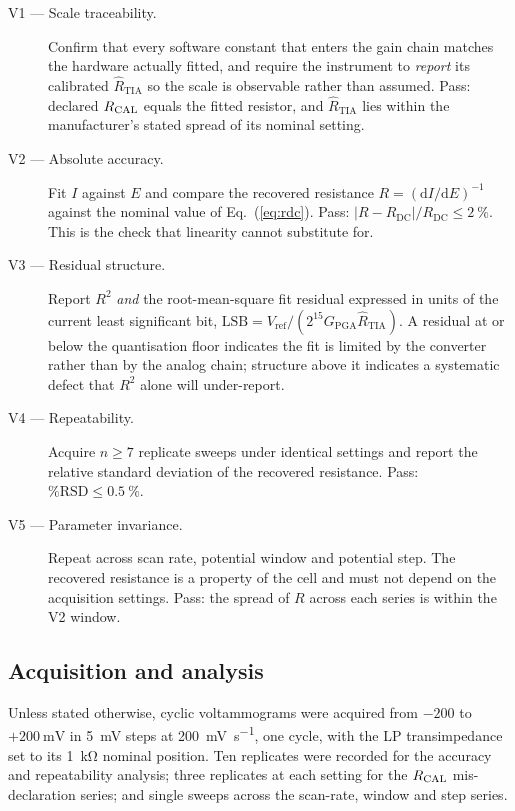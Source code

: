 \begin{description}
\item[V1 --- Scale traceability.] Confirm that every software constant that
  enters the gain chain matches the hardware actually fitted, and require the
  instrument to \emph{report} its calibrated $\hat{R}_{\mathrm{TIA}}$ so the
  scale is observable rather than assumed. Pass: declared $R_{\mathrm{CAL}}$ equals the
  fitted resistor, and $\hat{R}_{\mathrm{TIA}}$ lies within the manufacturer's
  stated spread of its nominal setting.
\item[V2 --- Absolute accuracy.] Fit $I$ against $E$ and compare the recovered
  resistance $R = (\mathrm{d}I/\mathrm{d}E)^{-1}$ against the nominal value of
  Eq.~(\ref{eq:rdc}). Pass: $|R - R_{\mathrm{DC}}|/R_{\mathrm{DC}} \le
  \SI{2}{\percent}$. This is the check that linearity cannot substitute for.
\item[V3 --- Residual structure.] Report $R^2$ \emph{and} the root-mean-square
  fit residual expressed in units of the current least significant bit,
  $\mathrm{LSB} = V_{\mathrm{ref}}/(2^{15}G_{\mathrm{PGA}}\hat{R}_{\mathrm{TIA}})$.
  A residual at or below the quantisation floor indicates the fit is limited by
  the converter rather than by the analog chain; structure above it indicates a
  systematic defect that $R^2$ alone will under-report.
\item[V4 --- Repeatability.] Acquire $n \ge 7$ replicate sweeps under identical
  settings and report the relative standard deviation of the recovered
  resistance. Pass: $\%\mathrm{RSD} \le \SI{0.5}{\percent}$.
\item[V5 --- Parameter invariance.] Repeat across scan rate, potential window
  and potential step. The recovered resistance is a property of the cell and
  must not depend on the acquisition settings. Pass: the spread of $R$ across
  each series is within the V2 window.
\end{description}

\subsection{Acquisition and analysis}
\label{sec:analysis}

Unless stated otherwise, cyclic voltammograms were acquired from
$-200$ to $+\SI{200}{\milli\volt}$ in \SI{5}{\milli\volt} steps at
\SI{200}{\milli\volt\per\second}, one cycle, with the LP transimpedance set to
its \SI{1}{\kilo\ohm} nominal position. Ten replicates were recorded for the
accuracy and repeatability analysis; three replicates at each setting for the
$R_{\mathrm{CAL}}$ mis-declaration series; and single sweeps across the scan-rate,
window and step series.

